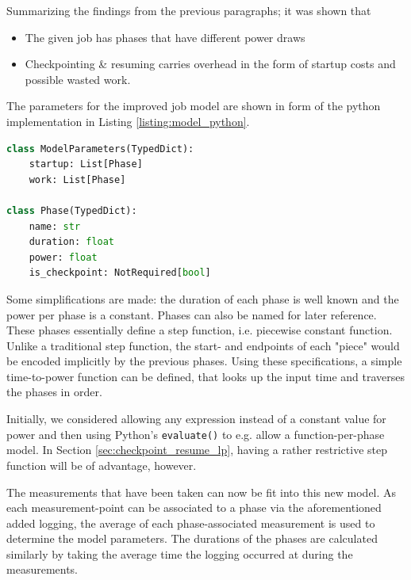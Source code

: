 Summarizing the findings from the previous paragraphs; it was shown that 

\begin{itemize}
    \item The given job has phases that have different power draws
    \item Checkpointing \& resuming carries overhead in the form of startup costs and possible wasted work.
\end{itemize}

The parameters for the improved job model are shown in form of the python implementation in Listing \ref{listing:model_python}.

\begin{minipage}{\linewidth}
\begin{lstlisting}[language=python, frame=single, numbers=none, caption={Python Model definition}, basicstyle=\ttfamily, label={listing:model_python}]
class ModelParameters(TypedDict):
    startup: List[Phase]
    work: List[Phase]
    
class Phase(TypedDict):
    name: str
    duration: float
    power: float
    is_checkpoint: NotRequired[bool]   
\end{lstlisting}
\end{minipage}

Some simplifications are made: the duration of each phase is well known and the power per phase is a constant. 
Phases can also be named for later reference.
These phases essentially define a step function, i.e. piecewise constant function.
Unlike a traditional step function, the start- and endpoints of each "piece" would be encoded implicitly by the previous phases.
Using these specifications, a simple time-to-power function can be defined, that looks up the input time and traverses the phases in order.

Initially, we considered allowing any expression instead of a constant value for power and then using Python's \verb|evaluate()| to e.g. allow a function-per-phase model.
In Section \ref{sec:checkpoint_resume_lp}, having a rather restrictive step function will be of advantage, however. 

The measurements that have been taken can now be fit into this new model. 
As each measurement-point can be associated to a phase via the aforementioned added logging, the average of each phase-associated measurement is used to determine the model parameters. 
The durations of the phases are calculated similarly by taking the average time the logging occurred at during the measurements.

